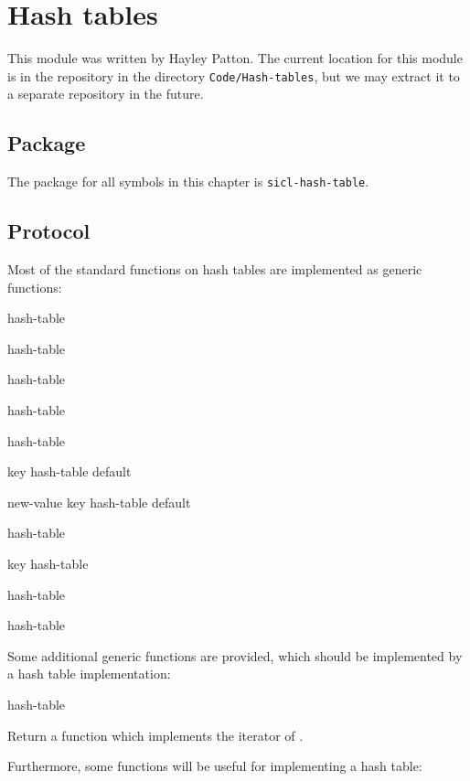 \chapter{Hash tables}

This module was written by Hayley Patton.  The current location for
this module is in the \sysname{} repository in the directory
\texttt{Code/Hash-tables}, but we may extract it to a separate
repository in the future.

\section{Package}

The package for all symbols in this chapter is \texttt{sicl-hash-table}.

\section{Protocol}

Most of the standard functions on hash tables are implemented as
generic functions:

{\small{} {hash-table}
}

{\small{} {hash-table}
}

{\small{} {hash-table}
}

{\small{} {hash-table}
}

{\small{} {hash-table}
}

{\small{} {key hash-table \optional default}
}

{\small{} {new-value key hash-table \optional default}
}

{\small{} {hash-table}
}

{\small{} {key hash-table}
}

{\small{} {hash-table}
}

{\small{} {hash-table}
}

Some additional generic functions are provided, which should be implemented
by a hash table implementation:

 {hash-table}

Return a function which implements the iterator of
.

Furthermore, some functions will be useful for implementing a hash
table:

